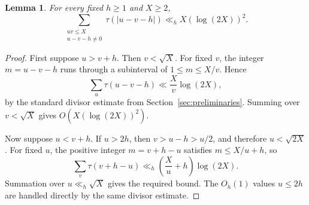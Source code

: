 \documentclass[11pt,reqno]{amsart}
\numberwithin{equation}{section}
\theoremstyle{plain}
\newtheorem{lemma}[theorem]{Lemma}
\theoremstyle{definition}
\theoremstyle{remark}
\begin{document}
\begin{lemma}\label{lem:shifted-divisor-sum}
For every fixed $h\ge1$ and $X\ge2$,
\[
\sum_{\substack{uv\le X\\u-v-h\ne0}}
\tau(|u-v-h|)
\ll_h X(\log(2X))^2.
\]
\end{lemma}
\begin{proof}
\begin{sloppypar}
First suppose $u>v+h$. Then $v<\sqrt X$. For fixed $v$, the integer $m=u-v-h$ runs through a subinterval of $1\le m\le X/v$. Hence
\[
\sum_u\tau(u-v-h)\ll\frac Xv\log(2X),
\]
by the standard divisor estimate from Section~\ref{sec:preliminaries}. Summing over $v<\sqrt X$ gives $O(X(\log(2X))^2)$.
\end{sloppypar}

Now suppose $u<v+h$. If $u>2h$, then $v>u-h>u/2$, and therefore $u<\sqrt{2X}$. For fixed $u$, the positive integer $m=v+h-u$ satisfies $m\le X/u+h$, so
\[
\sum_v\tau(v+h-u)
\ll_h
\left(\frac Xu+h\right)\log(2X).
\]
Summation over $u\ll_h\sqrt X$ gives the required bound. The $O_h(1)$ values $u\le2h$ are handled directly by the same divisor estimate.
\end{proof}
\end{document}
